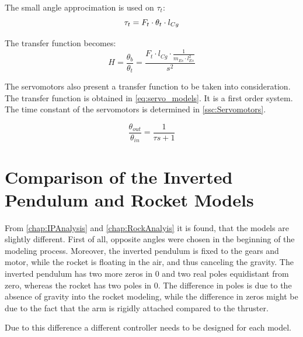 		The small angle approcimation is used on $\tau_t$:
		\begin{equation}
		\tau_t = F_t \cdot \theta_t \cdot l_{Cg} \addunit{\newton$\cdot$\meter} \label{eq:tau_t_lin}
		\end{equation}
		
		The transfer function becomes:
		\begin{equation}
		H=\frac{\theta_b}{\theta_t} = \frac{F_t \cdot l_{Cg} \cdot \frac{1}{m_{Es} \cdot l_{Es}^2}}{s^2}
		\label{eq:rocket_angle_model_tf_2}
		\end{equation}
		
		The servomotors also present a transfer function to be taken into consideration. The transfer function is obtained in \autoref{eq:servo_models}. It is a first order system. The time constant of the servomotors is determined in \autoref{ssc:Servomotors}.
		
		\begin{equation}
		\frac{\theta_{out}}{\theta_{in}}=\frac{1}{\tau s + 1}  \label{eq:servo_model}
		\end{equation}
		\startexplain
		\stopexplain
		
\section{Comparison of the Inverted Pendulum and Rocket Models}\label{sec:ModelComp}

From \autoref{chap:IPAnalysis} and \autoref{chap:RockAnalyis} it is found, that the models are slightly different. First of all, opposite angles were chosen in the beginning of the modeling process. Moreover, the inverted pendulum is fixed to the gears and motor, while the rocket is floating in the air, and thus canceling the gravity. The inverted pendulum has two more zeros in 0 and two real poles equidistant from zero, whereas the rocket has two poles in 0. The difference in poles is due to the absence of gravity into the rocket modeling, while the difference in zeros might be due to the fact that the arm is rigidly attached compared to the thruster.

Due to this difference a different controller needs to be designed for each model.
		
